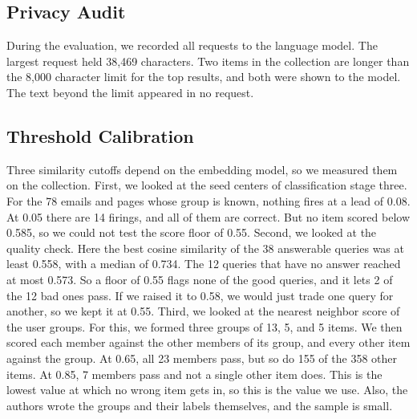 \documentclass[conference]{IEEEtran}
\begin{document}
\subsection{Privacy Audit}
During the evaluation, we recorded all requests to the language model. The largest request held 38,469 characters. Two items in the collection are longer than the 8,000 character limit for the top results, and both were shown to the model. The text beyond the limit appeared in no request.

\subsection{Threshold Calibration}
Three similarity cutoffs depend on the embedding model, so we measured them on the collection. First, we looked at the seed centers of classification stage three. For the 78 emails and pages whose group is known, nothing fires at a lead of 0.08. At 0.05 there are 14 firings, and all of them are correct. But no item scored below 0.585, so we could not test the score floor of 0.55. Second, we looked at the quality check. Here the best cosine similarity of the 38 answerable queries was at least 0.558, with a median of 0.734. The 12 queries that have no answer reached at most 0.573. So a floor of 0.55 flags none of the good queries, and it lets 2 of the 12 bad ones pass. If we raised it to 0.58, we would just trade one query for another, so we kept it at 0.55. Third, we looked at the nearest neighbor score of the user groups. For this, we formed three groups of 13, 5, and 5 items. We then scored each member against the other members of its group, and every other item against the group. At 0.65, all 23 members pass, but so do 155 of the 358 other items. At 0.85, 7 members pass and not a single other item does. This is the lowest value at which no wrong item gets in, so this is the value we use. Also, the authors wrote the groups and their labels themselves, and the sample is small.

\end{document}
